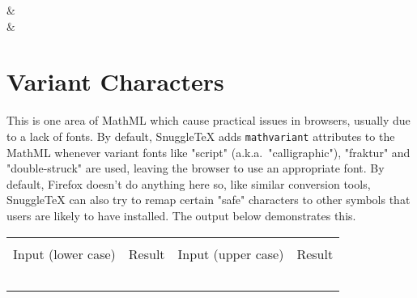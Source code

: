 \begin{ndemotable}
 &  \\

 &
  \\
\end{ndemotable}

\section*{Variant Characters}

This is one area of MathML which cause practical issues in browsers, usually due to a lack
of fonts. By default, SnuggleTeX adds \texttt{mathvariant} attributes to the MathML whenever
variant fonts like "script" (a.k.a.\ "calligraphic"), "fraktur" and "double-struck" are used,
leaving the browser to use an appropriate font. By default, Firefox doesn't do anything here
so, like similar conversion tools, SnuggleTeX can also try to remap certain "safe" characters
to other symbols that users are likely to have installed. The output below demonstrates this.

\newcommand{\vcdemo}[1]{\minout{#1{abcdefghijklmnopqrstuvwxyz}} & \minout{#1{ABCDEFGHIJKLMNOPQRSTUVWXYZ}} \\ }
\newenvironment{vctable}
{\begin{center}
 \begin{tabular}{|r|l|r|l|}
 \hline \\
 Input (lower case) & Result & Input (upper case) & Result \\
 \hline \\
}{\hline
 \end{tabular}
 \end{center}
}
\begin{vctable}
\vcdemo{\mathcal}
\vcdemo{\mathsc}
\vcdemo{\mathbb}
\vcdemo{\mathfrak}
\end{vctable}
